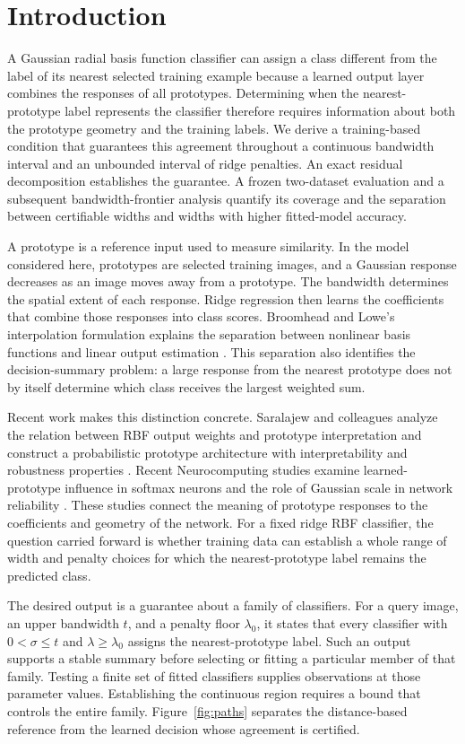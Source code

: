 \documentclass[preprint,12pt]{elsarticle}
\begin{document}
\section{Introduction}
A Gaussian radial basis function classifier can assign a class different from the label of its nearest selected training example because a learned output layer combines the responses of all prototypes. Determining when the nearest-prototype label represents the classifier therefore requires information about both the prototype geometry and the training labels. We derive a training-based condition that guarantees this agreement throughout a continuous bandwidth interval and an unbounded interval of ridge penalties. An exact residual decomposition establishes the guarantee. A frozen two-dataset evaluation and a subsequent bandwidth-frontier analysis quantify its coverage and the separation between certifiable widths and widths with higher fitted-model accuracy.

A prototype is a reference input used to measure similarity. In the model considered here, prototypes are selected training images, and a Gaussian response decreases as an image moves away from a prototype. The bandwidth determines the spatial extent of each response. Ridge regression then learns the coefficients that combine those responses into class scores. Broomhead and Lowe's interpolation formulation explains the separation between nonlinear basis functions and linear output estimation \citep{broomhead1988}. This separation also identifies the decision-summary problem: a large response from the nearest prototype does not by itself determine which class receives the largest weighted sum.

Recent work makes this distinction concrete. Saralajew and colleagues analyze the relation between RBF output weights and prototype interpretation and construct a probabilistic prototype architecture with interpretability and robustness properties \citep{saralajew2025}. Recent Neurocomputing studies examine learned-prototype influence in softmax neurons and the role of Gaussian scale in network reliability \citep{fazaeli2026,noorizadegan2026reliable}. These studies connect the meaning of prototype responses to the coefficients and geometry of the network. For a fixed ridge RBF classifier, the question carried forward is whether training data can establish a whole range of width and penalty choices for which the nearest-prototype label remains the predicted class.

The desired output is a guarantee about a family of classifiers. For a query image, an upper bandwidth $t$, and a penalty floor $\lambda_0$, it states that every classifier with $0<\sigma\leq t$ and $\lambda\geq\lambda_0$ assigns the nearest-prototype label. Such an output supports a stable summary before selecting or fitting a particular member of that family. Testing a finite set of fitted classifiers supplies observations at those parameter values. Establishing the continuous region requires a bound that controls the entire family. Figure~\ref{fig:paths} separates the distance-based reference from the learned decision whose agreement is certified.
\end{document}

